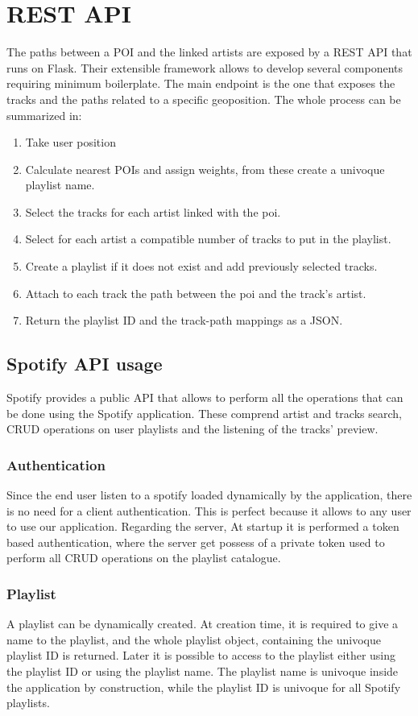 \documentclass[paper=a4, fontsize=11pt]{scrartcl}
\begin{document}
\section{REST API}
The paths between a POI and the linked artists are exposed by a REST API that runs on Flask. Their extensible framework allows to develop several components requiring minimum boilerplate.
The main endpoint is the one that exposes the tracks and the paths related to a specific geoposition.
The whole process can be summarized in:
\begin{enumerate}
\item Take user position
\item Calculate nearest POIs and assign weights, from these create a univoque playlist name.
\item Select the tracks for each artist linked with the poi.
\item Select for each artist a compatible number of tracks to put in the playlist.
\item Create a playlist if it does not exist and add previously selected tracks.
\item Attach to each track the path between the poi and the track's artist.
\item Return the playlist ID and the track-path mappings as a JSON.
\end{enumerate}
\subsection{Spotify API usage}
Spotify provides a public API that allows to perform all the operations that can be done using the Spotify application. These comprend artist and tracks search, CRUD operations on user playlists and the listening of the tracks' preview.
\subsubsection{Authentication}
Since the end user listen to a spotify loaded dynamically by the application, there is no need for a client authentication. This is perfect because it allows to any user to use our application. Regarding the server, At startup it is performed a token based authentication, where the server get possess of a private token used to perform all CRUD operations on the playlist catalogue.
\subsubsection{Playlist}
A playlist can be dynamically created. At creation time, it is required to give a name to the playlist, and the whole playlist object, containing the univoque playlist ID is returned. Later it is possible to access to the playlist either using the playlist ID or using the playlist name. The playlist name is univoque inside the application by construction, while the playlist ID is univoque for all Spotify playlists.
\end{document}
